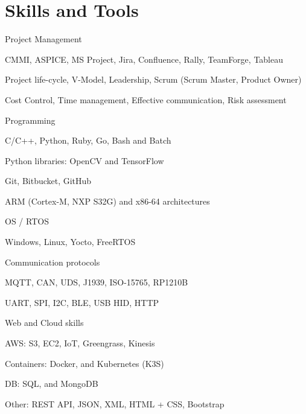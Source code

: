 \documentclass{resume} %
\begin{document}
\section{Skills and Tools}


\skillgroup
    {Project Management}
    {
    \begin{itemize-bullets}
        \item{CMMI, ASPICE, MS Project, Jira, Confluence, Rally, TeamForge, Tableau}
        \item{Project life-cycle, V-Model, Leadership, Scrum (Scrum Master, Product Owner)}
        \item{Cost Control, Time management, Effective communication, Risk assessment}
        \end{itemize-bullets}
    }


\skillgroup
    {Programming}
    {
    \begin{itemize-bullets}
        \item{C/C++, Python, Ruby, Go, Bash and Batch}
        \item{Python libraries: OpenCV and TensorFlow}
        \item{Git, Bitbucket, GitHub}
        \item{ARM (Cortex-M, NXP S32G) and x86-64 architectures}
        \end{itemize-bullets}
    }


\skillgroup
    {OS / RTOS}
    {
    \begin{itemize-bullets}
        \item{Windows, Linux, Yocto, FreeRTOS}
        \end{itemize-bullets}
    }


\skillgroup
    {Communication protocols}
    {
    \begin{itemize-bullets}
        \item{MQTT, CAN, UDS, J1939, ISO-15765, RP1210B}
        \item{UART, SPI, I2C, BLE, USB HID, HTTP}
        \end{itemize-bullets}
    }


\skillgroup
    {Web and Cloud skills}
    {
    \begin{itemize-bullets}
        \item{AWS: S3, EC2, IoT, Greengrass, Kinesis}
        \item{Containers: Docker, and Kubernetes (K3S)}
        \item{DB: SQL, and MongoDB}
        \item{Other: REST API, JSON, XML, HTML + CSS, Bootstrap}
        \end{itemize-bullets}
    }
\end{document}
